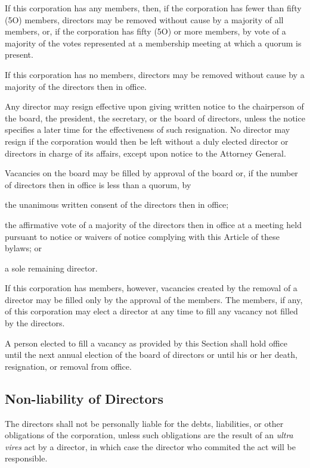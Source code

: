 \documentclass{article}
\begin{document}
	If this corporation has any members, then, if the corporation has fewer than fifty (5O) members, directors may be removed without cause by a majority of all members, or, if the corporation has fifty (5O) or more members, by vote of a majority of the votes represented at a membership meeting at which a quorum is present.
	
	If this corporation has no members, directors may be removed without cause by a majority of the directors then in office.
	
	Any director may resign effective upon giving written notice to the chairperson of the board, the president, the secretary, or the board of directors, unless the notice specifies a later time for the effectiveness of such resignation. No director may resign if the corporation would then be left without a duly elected director or directors in charge of its affairs, except upon notice to the Attorney General.
	
	Vacancies on the board may be filled by approval of the board or, if the number of directors then in office is less than a quorum, by
	\begin{inparaenum}[\itshape 1\upshape)]
		\item the unanimous written consent of the directors then in office; 
		\item the affirmative vote of a majority of the directors then in office at a meeting held pursuant to notice or waivers of notice complying with this Article of these bylaws; or 
		\item a sole remaining director. 
	\end{inparaenum}
	If this corporation has members, however, vacancies created by the removal of a director may be filled only by the approval of the members. The members, if any, of this corporation may elect a director at any time to fill any vacancy not filled by the directors.
	
	A person elected to fill a vacancy as provided by this Section shall hold office until the next annual election of the board of directors or until his or her death, resignation, or removal from office.
	
	\subsection{Non-liability of Directors}
	The directors shall not be personally liable for the debts, liabilities, or other obligations of the corporation, unless such obligations are the result of an \textit{ultra vires} act by a director, in which case the director who commited the act will be responsible.
	
\end{document}
